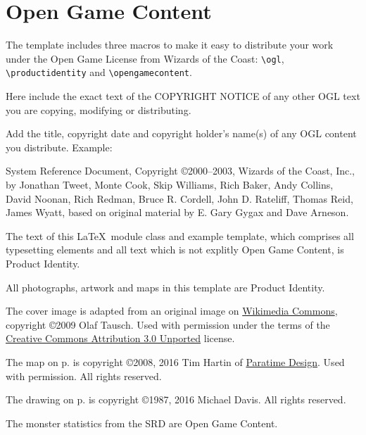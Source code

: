 \documentclass[a4paper,serif]{module}
\begin{document}
%
%

\section{Open Game Content}
\label{ogl}

The template includes three macros to make it easy to distribute your work under the Open Game License
from Wizards of the Coast: \verb|\ogl|, \verb|\productidentity| and \verb|\opengamecontent|.

\begin{ogl}
\item Here include the exact text of the COPYRIGHT NOTICE of any other OGL text you are copying, modifying or distributing.
\item Add the title, copyright date and copyright holder's name(s) of any OGL content you distribute. Example:
\item System Reference Document, Copyright \copyright 2000--2003, Wizards of the Coast, Inc., by Jonathan Tweet, Monte Cook,
Skip Williams, Rich Baker, Andy Collins, David Noonan, Rich Redman, Bruce R. Cordell, John D. Rateliff, Thomas Reid, James
Wyatt, based on original material by E. Gary Gygax and Dave Arneson.
\end{ogl}

\begin{productidentity}
\item The text of this \LaTeX~module class and example template, which comprises all typesetting elements and all text which
is not explitly Open Game Content, is Product Identity.
\modulecopyright

\item All photographs, artwork and maps in this template are Product Identity.

\item The cover image is adapted from an original image on
\href{https://commons.wikimedia.org/wiki/File:Karnak_Tempel_Vorhof_05.jpg}{Wikimedia Commons}, copyright \copyright 2009 Olaf
Tausch. Used with permission under the terms of the
\href{https://creativecommons.org/licenses/by/3.0/deed.en}{Creative Commons Attribution 3.0 Unported} license.

\item The map on p.\pageref{img:map} is copyright \copyright 2008, 2016 Tim Hartin of \href{http://paratime.ca}{Paratime Design}.
Used with permission. All rights reserved.

\item The drawing on p.\pageref{img:tomb} is copyright \copyright 1987, 2016 Michael Davis. All rights reserved.
\end{productidentity}

\begin{opengamecontent}
\item The monster statistics from the SRD are Open Game Content.
\end{opengamecontent}

%
%

\tableofcontents

\end{document}
